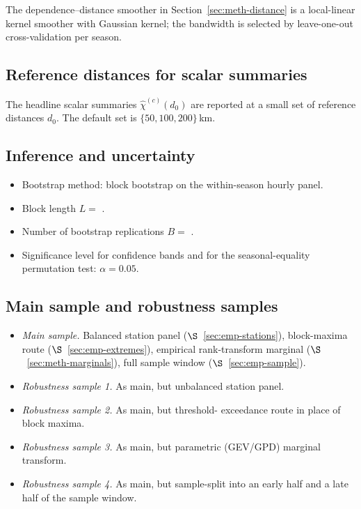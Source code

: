 The dependence--distance smoother in
Section~\ref{sec:meth-distance} is a local-linear kernel smoother
with Gaussian kernel; the bandwidth is selected by leave-one-out
cross-validation per season.

\subsection{Reference distances for scalar
summaries}\label{sec:emp-distances}

The headline scalar summaries
\(\widehat\chi^{(c)}(d_0)\) are reported at a small set of
reference distances \(d_0\). The default set is
\(\{50, 100, 200\}\)\,km.

\subsection{Inference and uncertainty}\label{sec:emp-inference}

\begin{itemize}
    \item Bootstrap method: block bootstrap on the within-season
          hourly panel.
    \item Block length \(L =\)
          .
    \item Number of bootstrap replications \(B =\)
          .
    \item Significance level for confidence bands and for the
          seasonal-equality permutation test: \(\alpha = 0.05\).
\end{itemize}

\subsection{Main sample and robustness samples}\label{sec:emp-samples}

\begin{itemize}
    \item \emph{Main sample.} Balanced station panel
          (\(\S\)~\ref{sec:emp-stations}), block-maxima route
          (\(\S\)~\ref{sec:emp-extremes}), empirical rank-transform
          marginal (\(\S\)~\ref{sec:meth-marginals}), full sample
          window (\(\S\)~\ref{sec:emp-sample}).
    \item \emph{Robustness sample 1.} As main, but unbalanced
          station panel.
    \item \emph{Robustness sample 2.} As main, but threshold-
          exceedance route in place of block maxima.
    \item \emph{Robustness sample 3.} As main, but parametric
          (GEV/GPD) marginal transform.
    \item \emph{Robustness sample 4.} As main, but sample-split
          into an early half and a late half of the sample window.
\end{itemize}

